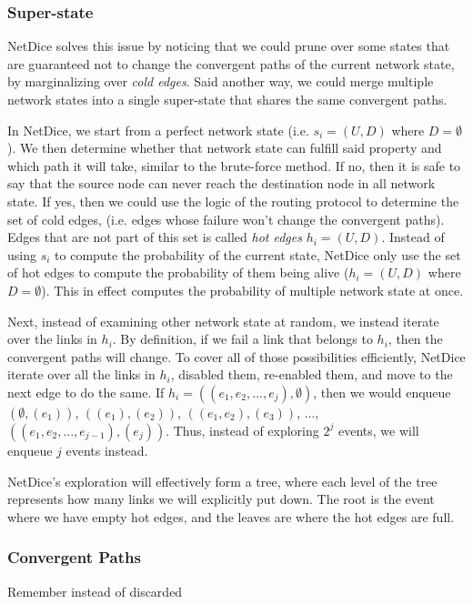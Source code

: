 \documentclass[10pt,sigconf,letterpaper,anonymous,nonacm]{acmart}
\begin{document}
\subsubsection{Super-state}
NetDice \cite{steffen2020probabilistic} solves this issue by noticing that we could prune over some 
states that are guaranteed not to change the convergent paths of the current network state, by 
marginalizing over \textit{cold edges}.
Said another way, we could merge multiple network states into a single super-state that shares 
the same convergent paths.

In NetDice, we start from a perfect network state (i.e. $s_i = (U, D)$ where $D = \emptyset$).
We then determine whether that network state can fulfill said property and which path it will 
take, similar to the brute-force method.
If no, then it is safe to say that the source node can never reach the destination node in all 
network state.
If yes, then we could use the logic of the routing protocol to determine the set of cold edges, 
(i.e. edges whose failure won't change the convergent paths). 
Edges that are not part of this set is called \textit{hot edges} $h_i = (U, D)$.
Instead of using $s_i$ to compute the probability of the current state, NetDice only use the set 
of hot edges to compute the probability of them being alive ($h_i = (U, D)$ where $D = \emptyset$).
This in effect computes the probability of multiple network state at once.

Next, instead of examining other network state at random, we instead iterate over the links in 
$h_i$.
By definition, if we fail a link that belongs to $h_i$, then the convergent paths will change.
To cover all of those possibilities efficiently, NetDice iterate over all the links in $h_i$, 
disabled them, re-enabled them, and move to the next edge to do the same.
If $h_i = ((e_1, e_2, ..., e_j), \emptyset)$, then we would enqueue $(\emptyset, (e_1))$, 
$((e_1), (e_2))$, $((e_1, e_2), (e_3))$, ..., $((e_1, e_2, ..., e_{j-1}), (e_j))$.
Thus, instead of exploring $2^j$ events, we will enqueue $j$ events instead. 

NetDice's exploration will effectively form a tree, where each level of the tree represents 
how many links we will explicitly put down.
The root is the event where we have empty hot edges, and the leaves are where the hot edges 
are full.

\subsubsection{Convergent Paths}
Remember instead of discarded
\end{document}
